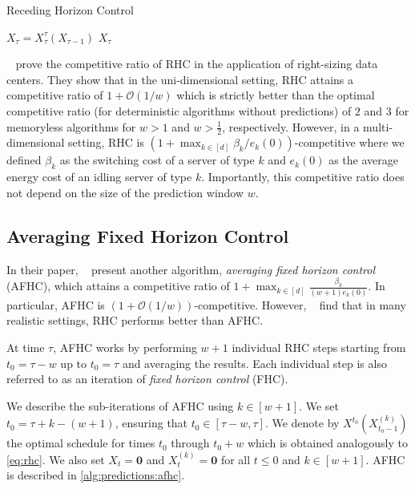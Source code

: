 \begin{algorithm}
    \caption{Receding Horizon Control~\cite{Lin2012}}\label{alg:predictions:rhc}
    $X_{\tau} = X_{\tau}^{\tau}(X_{\tau-1})$\;
    \Return $X_{\tau}$\;
\end{algorithm}

\citeauthor{Lin2012}~\cite{Lin2012} prove the competitive ratio of RHC in the application of right-sizing data centers. They show that in the uni-dimensional setting, RHC attains a competitive ratio of $1 + \mathcal{O}(1/w)$ which is strictly better than the optimal competitive ratio (for deterministic algorithms without predictions) of $2$ and $3$ for memoryless algorithms for $w > 1$ and $w > \frac{1}{2}$, respectively. However, in a multi-dimensional setting, RHC is $(1 + \max_{k \in [d]} \beta_k / e_k(0))$-competitive where we defined $\beta_k$ as the switching cost of a server of type $k$ and $e_k(0)$ as the average energy cost of an idling server of type $k$. Importantly, this competitive ratio does not depend on the size of the prediction window $w$.

\subsection{Averaging Fixed Horizon Control}

In their paper, \citeauthor{Lin2012}~\cite{Lin2012} present another algorithm, \emph{averaging fixed horizon control} (AFHC), which attains a competitive ratio of $1 + \max_{k \in [d]} \frac{\beta_k}{(w+1) e_k(0)}$. In particular, AFHC is $(1 + \mathcal{O}(1/w))$-competitive. However, \citeauthor{Lin2012}~\cite{Lin2012} find that in many realistic settings, RHC performs better than AFHC.

At time $\tau$, AFHC works by performing $w + 1$ individual RHC steps starting from $t_0 = \tau-w$ up to $t_0 = \tau$ and averaging the results. Each individual step is also referred to as an iteration of \emph{fixed horizon control} (FHC).

We describe the sub-iterations of AFHC using $k \in [w+1]$. We set $t_0 = \tau+k-(w+1)$, ensuring that $t_0 \in [\tau-w,\tau]$. We denote by $X^{t_0}(X_{t_0-1}^{(k)})$ the optimal schedule for times $t_0$ through $t_0+w$ which is obtained analogously to \cref{eq:rhc}. We also set $X_t = \mathbf{0}$ and $X_t^{(k)} = \mathbf{0}$ for all $t \leq 0$ and $k \in [w+1]$. AFHC is described in \cref{alg:predictions:afhc}.

